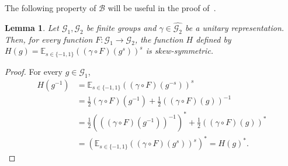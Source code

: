 \documentclass[a4paper,11pt]{article}
\newtheorem{lemma}[theorem]{Lemma}
\theoremstyle{definition}
\newcommand{\ex}[1]{\mathbb{E}_{#1}}
\newcommand{\gr}{\mathscr{G}}
\newcommand{\B}{\mathcal{B}}
\begin{document}
The following property of $\B$ will be useful in the proof of~.

\begin{lemma} \label{le:EHR-15}
    Let $\gr_1,\gr_2$ be finite groups and $\gamma \in \widehat{\gr_2}$ be a unitary representation. Then, for every function $F:\gr_1 \to \gr_2$, the function $H$ defined by $H(g) = \ex{s\in\{-1,1\}}( (\gamma\circ F)(g^s))^s$ is skew-symmetric. 
\end{lemma}
\begin{proof} For every $g\in\gr_1$,
    \begin{align*}
     H(g^{-1}) & = \ex{s\in\{-1,1\}}( (\gamma\circ F)(g^{-s}))^s  \\ 
            & = \frac{1}{2} (\gamma\circ F)(g^{-1})  + \frac{1}{2} ( (\gamma\circ F)(g))^{-1}  \\ 
            & = \frac{1}{2} (((\gamma\circ F)(g^{-1}))^{-1})^*  + \frac{1}{2} ((\gamma \circ F)(g))^{*}  \\ 
            & = ( \ex{s\in\{-1,1\}}( (\gamma\circ F)(g^s))^s)^*  = H(g)^*.
    \end{align*}
\end{proof}
\end{document}
